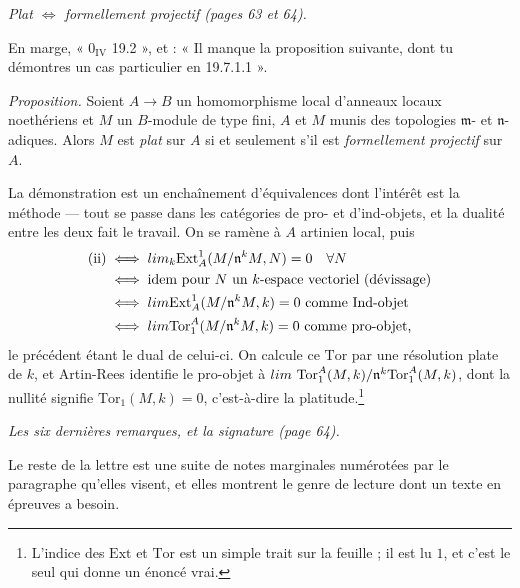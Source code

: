 \documentclass[11pt,a4paper]{article}
\begin{document}
\emph{Plat $\Longleftrightarrow$ formellement projectif (pages 63 et 64).}

En marge, « $0_{\mathrm{IV}}$ 19.2 », et : « Il manque la proposition suivante,
dont tu démontres un cas particulier en 19.7.1.1 ».

\emph{Proposition.} Soient $A \to B$ un homomorphisme local d'anneaux locaux
noethériens et $M$ un $B$-module de type fini, $A$ et $M$ munis des topologies
$\mathfrak{m}$- et $\mathfrak{n}$-adiques. Alors $M$ est \emph{plat} sur $A$ si
et seulement s'il est \emph{formellement projectif} sur $A$.

La démonstration est un enchaînement d'équivalences dont l'intérêt est la
méthode — tout se passe dans les catégories de pro- et d'ind-objets, et la
dualité entre les deux fait le travail. On se ramène à $A$ artinien local, puis
\begin{align*}
  \text{(ii)} &\iff \varinjlim_{k} \mathrm{Ext}^{1}_{A}(M/\mathfrak{n}^{k}M, N)
  = 0 \quad \forall N \\
  &\iff \text{idem pour } N \text{ un } k\text{-espace vectoriel (dévissage)} \\
  &\iff \varinjlim \mathrm{Ext}^{1}_{A}(M/\mathfrak{n}^{k}M, k) = 0 \text{ comme Ind-objet} \\
  &\iff \varprojlim \mathrm{Tor}^{A}_{1}(M/\mathfrak{n}^{k}M, k) = 0
  \text{ comme pro-objet,}
\end{align*}
le précédent étant le dual de celui-ci. On calcule ce $\mathrm{Tor}$ par une
résolution plate de $k$, et Artin-Rees identifie le pro-objet à
$\varprojlim\ \mathrm{Tor}^{A}_{1}(M,k)/\mathfrak{n}^{k}
\mathrm{Tor}^{A}_{1}(M,k)$, dont la nullité signifie $\mathrm{Tor}_{1}(M,k) = 0$,
c'est-à-dire la platitude.\footnote{L'indice des $\mathrm{Ext}$ et $\mathrm{Tor}$
est un simple trait sur la feuille ; il est lu $1$, et c'est le seul qui donne
un énoncé vrai.}

\emph{Les six dernières remarques, et la signature (page 64).}

Le reste de la lettre est une suite de notes marginales numérotées par le
paragraphe qu'elles visent, et elles montrent le genre de lecture dont un texte
en épreuves a besoin.
\end{document}

